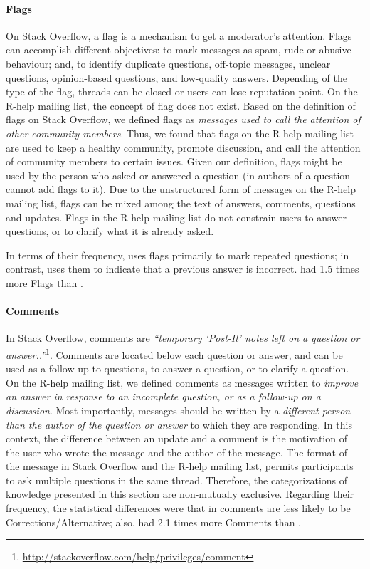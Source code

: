 \paragraph*{Flags}

	On Stack Overflow, a flag is a mechanism to get a moderator's attention.
	Flags can accomplish different objectives: to mark messages as spam, rude or abusive behaviour; and, to identify duplicate questions, off-topic messages, unclear questions, opinion-based questions, and low-quality answers.
	Depending of the type of the flag, threads can be closed or users can lose reputation point.
    On the R-help mailing list, the concept of flag does not exist. 
    Based on the definition of flags on Stack Overflow, we defined flags as \emph{messages used to call the attention of other community members}.
    Thus, we found that flags on the R-help mailing list are used to keep a healthy community, promote discussion, and call the attention of community members to certain issues.
    Given our definition, flags might be used by the person who asked or answered a question (in \SO authors of a question cannot add flags to it).
    Due to the unstructured form of messages on the R-help mailing list, flags can be mixed among the text of answers, comments, questions and updates.
	Flags in the R-help mailing list do not constrain users to answer questions, or to clarify what it is already asked.

In terms of their frequency, \SO uses flags primarily to mark repeated questions; in contrast, \RH uses them to indicate that a previous answer is incorrect. \SO had 1.5 times more Flags than \RH.


\paragraph*{Comments}
In Stack Overflow, comments are \textit{``temporary `Post-It' notes left on a question or answer..''}\footnote{\url{http://stackoverflow.com/help/privileges/comment}}.
	Comments are located below each question or answer, and can be used as a follow-up to questions, to answer a question, or to clarify a question.
	On the R-help mailing list, we defined comments as messages written to \emph{improve an answer in response to an incomplete question, or as a follow-up on a discussion}.
	Most importantly, messages should be written by a \emph{different person than the author of the question or answer} to which they are responding.
	In this context, the difference between an update and a comment is the motivation of the user who wrote the message and the author of the message.
	The format of the message in Stack Overflow and the R-help mailing list, permits participants to ask multiple questions in the same thread.
	Therefore, the categorizations of knowledge presented in this section are non-mutually exclusive.
        Regarding their frequency, the statistical differences were that in \SO comments are less likely to be Corrections/Alternative; also, \SO had 2.1 times more Comments than \RH.

